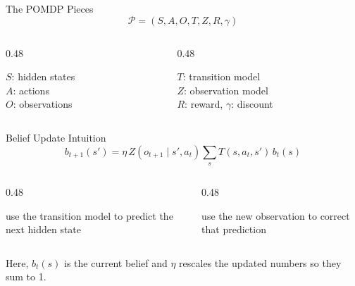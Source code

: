 \documentclass[aspectratio=169]{beamer}
\begin{document}
\begin{frame}{The POMDP Pieces}
\[
\mathcal{P}=(S,A,O,T,Z,R,\gamma)
\]
\begin{columns}[T,onlytextwidth]
  \begin{column}{0.48\textwidth}
    \begin{tcolorbox}[colback=notationbg,colframe=notationframe,boxrule=0.7pt,title=State and action]
    \small
    $S$: hidden states\\
    $A$: actions\\
    $O$: observations
    \end{tcolorbox}
  \end{column}
  \begin{column}{0.48\textwidth}
    \begin{tcolorbox}[colback=notationbg,colframe=notationframe,boxrule=0.7pt,title=Models and reward]
    \small
    $T$: transition model\\
    $Z$: observation model\\
    $R$: reward, $\gamma$: discount
    \end{tcolorbox}
  \end{column}
\end{columns}
\end{frame}

\begin{frame}{Belief Update Intuition}
\[
b_{t+1}(s')=\eta\, Z(o_{t+1}\mid s',a_t)\sum_s T(s,a_t,s')\, b_t(s)
\]
\begin{columns}[T,onlytextwidth]
  \begin{column}{0.48\textwidth}
    \begin{tcolorbox}[colback=plainbg,colframe=plainframe,boxrule=0.7pt,title=Step 1: predict]
    \small use the transition model to predict the next hidden state
    \end{tcolorbox}
  \end{column}
  \begin{column}{0.48\textwidth}
    \begin{tcolorbox}[colback=questionbg,colframe=questionframe,boxrule=0.7pt,title=Step 2: correct]
    \small use the new observation to correct that prediction
    \end{tcolorbox}
  \end{column}
\end{columns}
\begin{center}
\small
Here, $b_t(s)$ is the current belief and $\eta$ rescales the updated numbers so they sum to 1.
\end{center}
\end{frame}
\end{document}
